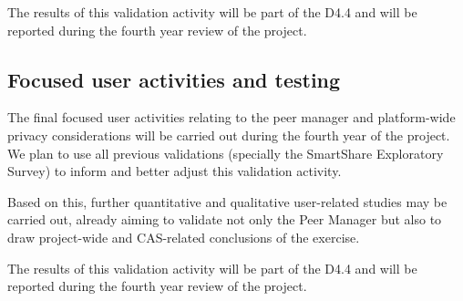 
The results of this validation activity will be part of the D4.4 and will be reported during the fourth year review of the project.

\subsection{Focused user activities and testing}
The final focused user activities relating to the peer manager and platform-wide privacy considerations will be carried out during the fourth year of the project. We plan to use all previous validations (specially the SmartShare Exploratory Survey) to inform and better adjust this validation activity. 

Based on this, further quantitative and qualitative user-related studies may be carried out, already aiming to validate not only the Peer Manager but also to draw project-wide and CAS-related conclusions of the exercise. 

The results of this validation activity will be part of the D4.4 and will be reported during the fourth year review of the project.
